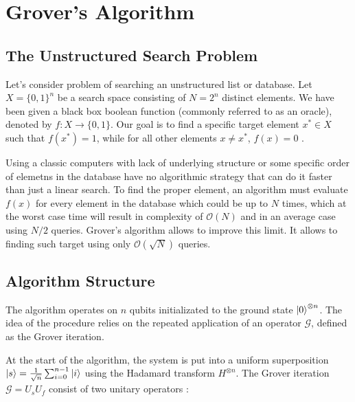 \section{Grover's Algorithm}
\label{sec:grover}

\subsection{The Unstructured Search Problem}
%
%

Let's consider problem of searching an unstructured list or database. 
Let $X = \{0, 1\}^n$ be a search space consisting of $N = 2^n$ distinct elements. 
%
%
We have been given a black box boolean function (commonly referred to as an oracle), 
denoted by $f: X \rightarrow \{0, 1\}$. 
%
%
Our goal is to find a specific target element $x^* \in X$ such that $f(x^*) = 1$, 
while for all other elements $x \neq x^*$, $f(x) = 0$ \cite{nielsen2010quantum}.
%
%

\bigskip
%
%
Using a classic computers with lack of underlying structure or some specific order of elemetns in the database have no 
algorithmic strategy that can do it faster than just a linear search. 
%
%
To find the proper element, an algorithm must evaluate $f(x)$ for every element in the database which could be up to $N$ times, 
which at the worst case time will result in complexity of $\mathcal{O}(N)$ and in an average case using $N/2$ queries.
%
%
Grover's algorithm allows to improve this limit. It allows to finding such target using only $\mathcal{O}(\sqrt{N})$ queries.
%
%

\subsection{Algorithm Structure}
%
%

The algorithm operates on $n$ qubits initializated to the ground state $\ket{0}^{\otimes n}$. 
The idea of the procedure relies on the repeated application of an operator $\mathcal{G}$, defined as the Grover iteration. 
%
%
%
%

\bigskip
At the start of the algorithm, the system is put into a uniform superposition $\ket{s} = \frac{1}{\sqrt{n}} \sum_{i=0}^{n-1} \ket{i}$ 
using the Hadamard transform $H^{\otimes n}$. 
The Grover iteration $\mathcal{G} = U_s U_f$ consist of two unitary operators \cite{kaye2007introduction}:
%
%

